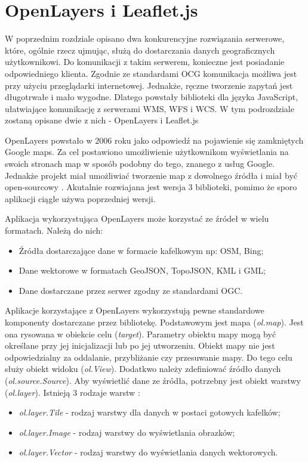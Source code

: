 \section{OpenLayers i Leaflet.js}
\label{chap:OpenLayers}

W poprzednim rozdziale opisano dwa konkurencyjne rozwiązania serwerowe, które, ogólnie rzecz ujmując, służą do dostarczania danych geograficznych użytkownikowi.
Do komunikacji z takim serwerem, konieczne jest posiadanie odpowiedniego klienta. Zgodnie ze standardami OCG \cite{OpenGIS_WMS2006,OpenGIS_WFS2010,OpenGIS_WCS2012}
komunikacja możliwa jest przy użyciu przeglądarki internetowej. Jednakże, ręczne tworzenie zapytań jest długotrwałe i mało wygodne. Dlatego powstały biblioteki
dla języka JavaScript, ułatwiające komunikację z serwerami WMS, WFS i WCS. W tym podrozdziale zostaną opisane dwie z nich - OpenLayers i Leaflet.js

OpenLayers powstało w 2006 roku jako odpowiedź na pojawienie się zamkniętych Google maps.
Za cel postawiono umożliwienie użytkownikom wyświetlania na swoich stronach map w sposób podobny do tego, znanego z usług Google.
Jednakże projekt miał umożliwiać tworzenie map z dowolnego źródła i miał być open-sourcowy \cite{website:OpenLayersHistory}.
Akutalnie rozwiajana jest wersja 3 biblioteki, pomimo że sporo aplikacji ciągle używa poprzedniej wersji.

Aplikacja wykorzystująca OpenLayers może korzystać ze źródeł w wielu formatach. Należą do nich:
\begin{itemize}
    \item Źródła dostarczające dane w formacie kafelkowym np: OSM, Bing;
    \item Dane wektorowe w formatach GeoJSON, TopoJSON, KML i GML;
    \item Dane dostarczane przez serwer zgodny ze standardami OGC.
\end{itemize}

Aplikacje korzystające z OpenLayers wykorzystują pewne standardowe komponenty dostarczane przez bibliotekę. Podstawowym jest mapa (\textit{ol.map}).
Jest ona rysowana w obiekcie celu (\textit{target}). Parametry obiektu mapy mogą być określane przy jej inicjalizacji lub po jej utworzeniu.
Obiekt mapy nie jest odpowiedzialny za oddalanie, przybliżanie czy przesuwanie mapy. Do tego celu służy obiekt widoku (\textit{ol.View}).
Dodatkwo należy zdefiniować źródło danych (\textit{ol.source.Source}).
Aby wyświetlić dane ze źródła, potrzebny jest obiekt warstwy (\textit{ol.layer}). Istnieją 3 rodzaje warstw \cite{website:OpenLayersDocumentation}:
\begin{itemize}
    \item \textit{ol.layer.Tile} - rodzaj warstwy dla danych w postaci gotowych kafelków;
    \item \textit{ol.layer.Image} - rodzaj warstwy do wyświetlania obrazków;
    \item \textit{ol.layer.Vector} - rodzaj warstwy do wyświetlania danych wektorowych.
\end{itemize}

